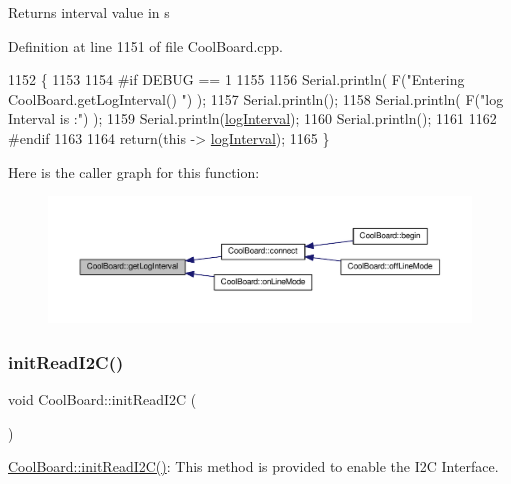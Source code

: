 \begin{DoxyReturn}{Returns}
interval value in s 
\end{DoxyReturn}


Definition at line 1151 of file Cool\+Board.\+cpp.


\begin{DoxyCode}
1152 \{
1153 
1154 \textcolor{preprocessor}{#if DEBUG == 1}
1155 
1156     Serial.println( F(\textcolor{stringliteral}{"Entering CoolBoard.getLogInterval() "}) );
1157     Serial.println();
1158     Serial.println( F(\textcolor{stringliteral}{"log Interval is :"}) );
1159     Serial.println(\hyperlink{class_cool_board_a84bc94413b64973e4aba8c467c97006c}{logInterval});
1160     Serial.println();
1161 
1162 \textcolor{preprocessor}{#endif}
1163 
1164     \textcolor{keywordflow}{return}(\textcolor{keyword}{this} -> \hyperlink{class_cool_board_a84bc94413b64973e4aba8c467c97006c}{logInterval});
1165 \}
\end{DoxyCode}
Here is the caller graph for this function\+:\nopagebreak
\begin{figure}[H]
\begin{center}
\leavevmode
\includegraphics[width=350pt]{d7/df9/class_cool_board_a7508e029f2ee17bb747ffab599285e0d_icgraph}
\end{center}
\end{figure}
\mbox{\label{class_cool_board_a397b46fadab8f530a8cf4d914c561366}} 
\subsubsection{\texorpdfstring{init\+Read\+I2\+C()}{initReadI2C()}}
{\footnotesize\ttfamily void Cool\+Board\+::init\+Read\+I2C (\begin{DoxyParamCaption}{ }\end{DoxyParamCaption})}

\hyperlink{class_cool_board_a397b46fadab8f530a8cf4d914c561366}{Cool\+Board\+::init\+Read\+I2\+C()}\+: This method is provided to enable the I2C Interface. 

